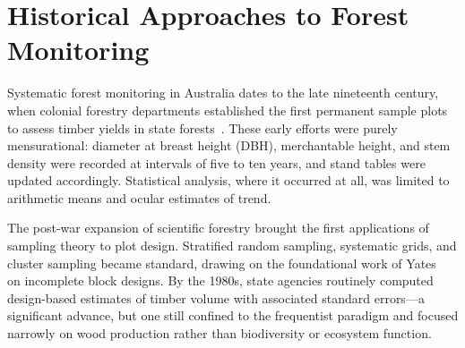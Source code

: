 \section{Historical Approaches to Forest Monitoring}

Systematic forest monitoring in Australia dates to the late nineteenth century,
when colonial forestry departments established the first permanent sample plots
to assess timber yields in state forests~\cite{bradshaw2012}. These early
efforts were purely mensurational: diameter at breast height (DBH), merchantable
height, and stem density were recorded at intervals of five to ten years, and
stand tables were updated accordingly. Statistical analysis, where it occurred
at all, was limited to arithmetic means and ocular estimates of trend.

The post-war expansion of scientific forestry brought the first applications of
sampling theory to plot design. Stratified random sampling, systematic grids,
and cluster sampling became standard, drawing on the foundational work of
Yates~\cite{gelman2013} on incomplete block designs. By the 1980s, state
agencies routinely computed design-based estimates of timber volume with
associated standard errors—a significant advance, but one still confined to the
frequentist paradigm and focused narrowly on wood production rather than
biodiversity or ecosystem function.
